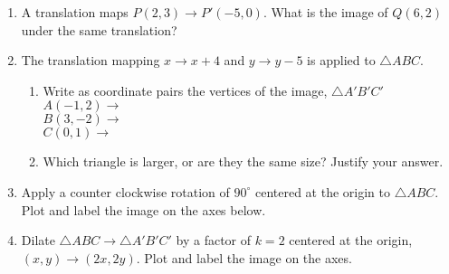 \documentclass[12pt, twoside]{article}
\begin{document}
\begin{enumerate}[itemsep=0.5cm]
\item A translation maps $P(2,3) \rightarrow P'(-5,0)$. What is the image of $Q(6,2)$ under the same translation? \vspace{1cm}
      
\item The translation mapping $x \rightarrow x+4$ and $y \rightarrow y - 5$ is applied to $\triangle ABC$.
  \begin{enumerate}
    \item Write as coordinate pairs the vertices of the image, $\triangle A'B'C'$ \\[0.3cm]
    $A(-1,2) \rightarrow$ \\[0.7cm]
    $B(3,-2) \rightarrow$ \\[0.7cm]
    $C(0,1) \rightarrow$ \\[0.1cm]
    \item Which triangle is larger, or are they the same size? Justify your answer.
  \end{enumerate} \vspace{2cm}

\newpage
\item Apply a counter clockwise rotation of $90^\circ$ centered at the origin to $\triangle ABC$. Plot and label the image on the axes below.
  \begin{center}
  \end{center}

\item Dilate $\triangle ABC \rightarrow \triangle A'B'C'$ by a factor of $k=2$ centered at the origin, \\
$(x,y) \rightarrow (2x, 2y)$. Plot and label the image on the axes.
  \begin{center}
  \end{center}


\end{enumerate}
\end{document}
